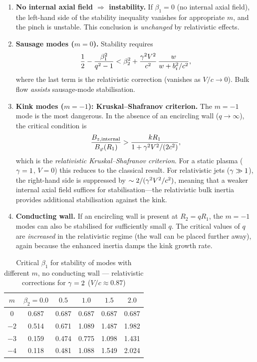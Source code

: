 \begin{enumerate}
\item \textbf{No internal axial field $\Rightarrow$ instability.}
  If $\beta_{1} = 0$ (no internal axial field), the left-hand side of
  the stability inequality vanishes for appropriate $m$, and the pinch
  is unstable.  This conclusion is \emph{unchanged} by relativistic
  effects.

\item \textbf{Sausage modes ($m = 0$).}  Stability requires
  \begin{equation}
  \label{eq:rel-115-m0}
  \frac{1}{2} - \frac{\beta_{1}^{2}}{q^{2}-1}
    < \beta_{2}^{2}
    + \frac{\gamma^{2}V^{2}}{c^{2}}\,
      \frac{w}{w+b_{i}^{2}/c^{2}},
  \end{equation}
  where the last term is the relativistic correction (vanishes as
  $V/c \to 0$).  Bulk flow \emph{assists} sausage-mode stabilisation.

\item \textbf{Kink modes ($m = -1$): Kruskal--Shafranov criterion.}
  The $m = -1$ mode is the most dangerous.  In the absence of an
  encircling wall ($q \to \infty$), the critical condition is
  \begin{equation}
  \label{eq:rel-115-KS}
  \frac{B_{z,\mathrm{internal}}}{B_{\varphi}(R_{1})}
    > \frac{kR_{1}}{1 + \gamma^{2}V^{2}/(2c^{2})},
  \end{equation}
  which is the \emph{relativistic Kruskal--Shafranov criterion}.  For
  a static plasma ($\gamma = 1$, $V = 0$) this reduces to the classical
  result.  For relativistic jets ($\gamma \gg 1$), the right-hand side
  is suppressed by $\sim 2/(\gamma^{2}V^{2}/c^{2})$, meaning that a
  weaker internal axial field suffices for stabilisation---the
  relativistic bulk inertia provides additional stabilisation against
  the kink.

\item \textbf{Conducting wall.}  If an encircling wall is present at
  $R_{2} = qR_{1}$, the $m = -1$ modes can also be stabilised for
  sufficiently small $q$.  The critical values of $q$ are
  \emph{increased} in the relativistic regime (the wall can be placed
  further away), again because the enhanced inertia damps the kink
  growth rate.
\end{enumerate}

\begin{table}[ht]
\centering
\caption{Critical $\beta_{1}$ for stability of modes with different
$m$, no conducting wall --- relativistic corrections for $\gamma = 2$
($V/c \approx 0.87$)}
\label{tab:rel-LXIV}
\begin{tabular}{cccccc}
\hline
$m$ & $\beta_{2}=0.0$ & $0.5$ & $1.0$ & $1.5$ & $2.0$ \\
\hline
$0$   & 0.687 & 0.687 & 0.687 & 0.687 & 0.687 \\
$-2$  & 0.514 & 0.671 & 1.089 & 1.487 & 1.982 \\
$-3$  & 0.159 & 0.474 & 0.775 & 1.098 & 1.431 \\
$-4$  & 0.118 & 0.481 & 1.088 & 1.549 & 2.024 \\
\hline
\end{tabular}
\end{table}

